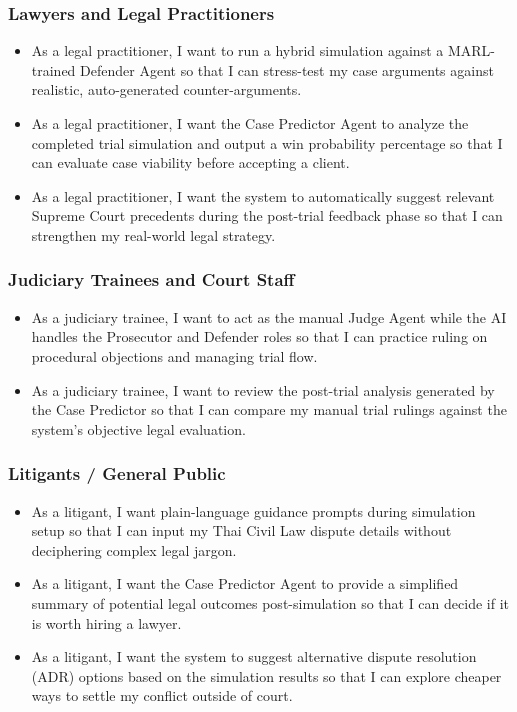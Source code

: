 \subsubsection{Lawyers and Legal Practitioners}
\begin{itemize}
    \item As a legal practitioner, I want to run a hybrid simulation against a MARL-trained Defender Agent so that I can stress-test my case arguments against realistic, auto-generated counter-arguments.
    \item As a legal practitioner, I want the Case Predictor Agent to analyze the completed trial simulation and output a win probability percentage so that I can evaluate case viability before accepting a client.
    \item As a legal practitioner, I want the system to automatically suggest relevant Supreme Court precedents during the post-trial feedback phase so that I can strengthen my real-world legal strategy.
\end{itemize}

\subsubsection{Judiciary Trainees and Court Staff}
\begin{itemize}
    \item As a judiciary trainee, I want to act as the manual Judge Agent while the AI handles the Prosecutor and Defender roles so that I can practice ruling on procedural objections and managing trial flow.
    \item As a judiciary trainee, I want to review the post-trial analysis generated by the Case Predictor so that I can compare my manual trial rulings against the system's objective legal evaluation.
\end{itemize}

\subsubsection{Litigants / General Public}
\begin{itemize}
    \item As a litigant, I want plain-language guidance prompts during simulation setup so that I can input my Thai Civil Law dispute details without deciphering complex legal jargon.
    \item As a litigant, I want the Case Predictor Agent to provide a simplified summary of potential legal outcomes post-simulation so that I can decide if it is worth hiring a lawyer.
    \item As a litigant, I want the system to suggest alternative dispute resolution (ADR) options based on the simulation results so that I can explore cheaper ways to settle my conflict outside of court.
\end{itemize}

